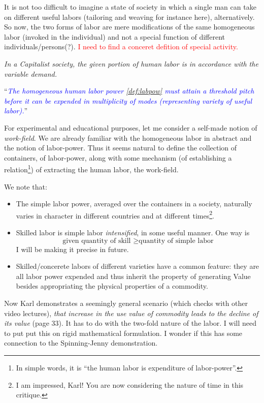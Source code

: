 \documentclass[12pt]{extarticle}
\theoremstyle{definition}
\newenvironment{remark}[1][Remark]{\begin{trivlist}
\item[\hskip \labelsep {\bfseries #1}]}{\end{trivlist}}
\begin{document}
It is not too difficult to imagine a state of society in which a single man can take on different useful labors (tailoring and weaving for instance here), alternatively.  So now, the two forms of labor are mere modifications of the same homogeneous labor (invoked in the individual) and not a special function of different individuals/persons(?).  \textcolor{red}{I need to find a conceret defition of special activity.}

\emph{In a Capitalist society, the given portion of human labor is in accordance with the variable demand.}

``\emph{\textcolor{blue}{The homogeneous human labor power \ref{def:labpow} must attain a threshold pitch before it can be expended in multiplicity of modes (representing variety of useful labor).}}''

For experimental and educational purposes, let me consider a self-made notion of \emph{work-field}.  We are already familiar with the homogeneous labor in abstract and the notion of labor-power.  Thus it seems natural to define the collection of containers, of labor-power, along with some mechanism (of establishing a relation\footnote{In simple words, it is ``the human labor is expenditure of labor-power''.}) of extracting the human labor, the work-field.
\begin{remark}
  \label{rem:labnat2fold}
  We note that:
  \begin{itemize}
  \item The simple labor power, averaged over the containers in a society, naturally varies in character in different countries and at different times\footnote{I am impressed, Karl!  You are now considering the nature of time in this critique.}.
  \item Skilled labor is simple labor \emph{intensified}, in some useful manner.  One way is
    \begin{equation}
      \text{given quantity of skill } \geq \text{quantity of simple labor}
    \end{equation}
    I will be making it precise in future.
    \item Skilled/concerete labors of different varieties have a common feature: they are all labor power expended and thus inherit the property of generating Value besides appropriating the physical properties of a commodity.
  \end{itemize}
\end{remark}

Now Karl demonstrates a seemingly general scenario (which checks with other video lectures), \emph{that increase in the use value of commodity leads to the decline of its value} (page 33).  It has to do with the two-fold nature of the labor.  I will need to put put this on rigid mathematical formulation.  I wonder if this has some connection to the Spinning-Jenny demonstration.
\end{document}
